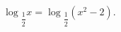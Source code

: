 \begin{ex}[type=equation]
	\begin{condition}
		$\log$\tiny$_{\dfrac{1}{2}}$\normalsize$ x = \log$\tiny$_{\dfrac{1}{2}}$\normalsize$ \left(x^2 - 2\right).$
	\end{condition}
\end{ex}